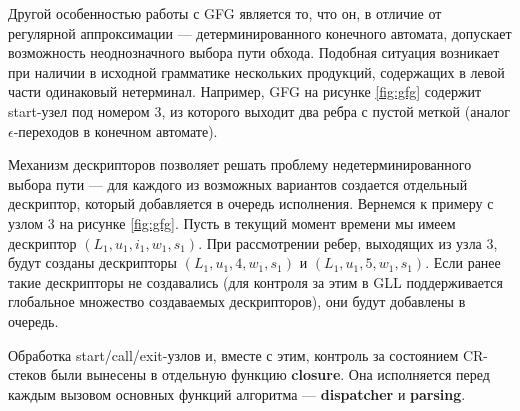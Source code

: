 Другой особенностью работы с GFG является то, что он, в отличие от регулярной аппроксимации --- детерминированного конечного автомата, допускает возможность неоднозначного выбора пути обхода. 
Подобная ситуация возникает при наличии в исходной грамматике нескольких продукций, содержащих в левой части одинаковый нетерминал. 
Например, GFG на рисунке \ref{fig:gfg} содержит start-узел под номером 3, из которого выходит два ребра с пустой меткой (аналог $\epsilon$-переходов в конечном автомате).

Механизм дескрипторов позволяет решать проблему недетерминированного выбора пути --- для каждого из возможных вариантов создается отдельный дескриптор, который добавляется в очередь исполнения. 
Вернемся к примеру с узлом 3 на рисунке \ref{fig:gfg}. Пусть в текущий момент времени мы имеем дескриптор $(L_1, u_1, i_1, w_1, s_1)$. 
При рассмотрении ребер, выходящих из узла 3, будут созданы дескрипторы $(L_1, u_1, 4, w_1, s_1)$ и $(L_1, u_1, 5, w_1, s_1)$. Если ранее такие дескрипторы не создавались (для контроля за этим в GLL поддерживается глобальное множество создаваемых дескрипторов), они будут добавлены в очередь.

Обработка start/call/exit-узлов и, вместе с этим, контроль за состоянием CR-стеков были вынесены в отдельную функцию \textbf{closure}. Она исполняется перед каждым вызовом основных функций алгоритма --- \textbf{dispatcher} и \textbf{parsing}. 


